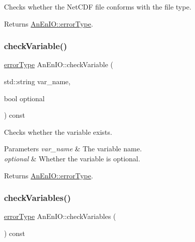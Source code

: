 Checks whether the Net\+C\+DF file conforms with the file type.

\begin{DoxyReturn}{Returns}
\mbox{\hyperlink{class_an_en_i_o_aa56bc1ec6610b86db4349bce20f9ead0}{An\+En\+I\+O\+::error\+Type}}. 
\end{DoxyReturn}
\mbox{\label{class_an_en_i_o_ab7f3ba245b7acb11184e0a5b3490a84b}} 
\subsubsection{\texorpdfstring{check\+Variable()}{checkVariable()}}
{\footnotesize\ttfamily \mbox{\hyperlink{class_an_en_i_o_aa56bc1ec6610b86db4349bce20f9ead0}{error\+Type}} An\+En\+I\+O\+::check\+Variable (\begin{DoxyParamCaption}\item[{std\+::string}]{var\+\_\+name,  }\item[{bool}]{optional }\end{DoxyParamCaption}) const}

Checks whether the variable exists. 
\begin{DoxyParams}{Parameters}
{\em var\+\_\+name} & The variable name. \\
\hline
{\em optional} & Whether the variable is optional. \\
\hline
\end{DoxyParams}
\begin{DoxyReturn}{Returns}
\mbox{\hyperlink{class_an_en_i_o_aa56bc1ec6610b86db4349bce20f9ead0}{An\+En\+I\+O\+::error\+Type}}. 
\end{DoxyReturn}
\mbox{\label{class_an_en_i_o_a44347f497bdf775fcf214ec75d8b6470}} 
\subsubsection{\texorpdfstring{check\+Variables()}{checkVariables()}}
{\footnotesize\ttfamily \mbox{\hyperlink{class_an_en_i_o_aa56bc1ec6610b86db4349bce20f9ead0}{error\+Type}} An\+En\+I\+O\+::check\+Variables (\begin{DoxyParamCaption}{ }\end{DoxyParamCaption}) const}

